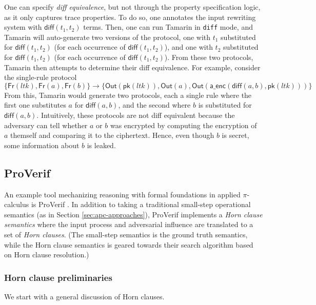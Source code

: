 \documentclass{article}
\theoremstyle{definition}
\begin{document}
One can specify \emph{diff equivalence}, but not through the property specification logic, as it only captures trace properties. To do so, one annotates the input rewriting system with $\textsf{diff}(t_1, t_2)$ terms. Then, one can run Tamarin in \texttt{diff} mode, and Tamarin will auto-generate two versions of the protocol, one with $t_1$ substituted for $\textsf{diff}(t_1, t_2)$ (for each occurrence of $\textsf{diff}(t_1, t_2)$), and one with $t_2$ substituted for $\textsf{diff}(t_1, t_2)$ (for each occurrence of $\textsf{diff}(t_1, t_2)$).
From these two protocols, Tamarin then attempts to determine their diff equivalence. For example, consider the single-rule protocol $$\{\mathsf{Fr}(ltk), \mathsf{Fr}(a), \mathsf{Fr}(b)\} \rightarrow \{ \mathsf{Out}(\mathsf{pk}(ltk)), \mathsf{Out}(a), \mathsf{Out}(\mathsf{a\_enc}(\mathsf{diff}(a, b), \mathsf{pk}(ltk)))\}$$
From this, Tamarin would generate two protocols, each a single rule where the first one substitutes $a$ for $\mathsf{diff}(a,b)$, and the second where $b$ is substituted for $\mathsf{diff}(a, b)$. Intuitively, these protocols are not diff equivalent because the adversary can tell whether $a$ or $b$ was encrypted by computing the encryption of $a$ themself and comparing it to the ciphertext. Hence, even though $b$ is secret, some information about $b$ is leaked.

\subsection{ProVerif} \label{sec:proverif} 
An example tool mechanizing reasoning with formal foundations in applied $\pi$-calculus 
is ProVerif \cite{proverif}. 
In addition to taking a traditional small-step operational semantics 
(as in Section \ref{sec:apc-approaches}), 
ProVerif implements a \textit{Horn clause semantics} 
where the input process and adversarial influence are translated to a set of \textit{Horn clauses}. 
(The small-step semantics is the ground truth semantics, while the Horn clause semantics 
is geared towards their search algorithm based on Horn clause resolution.)

\subsubsection{Horn clause preliminaries}
We start with a general discussion of Horn clauses.
\end{document}
